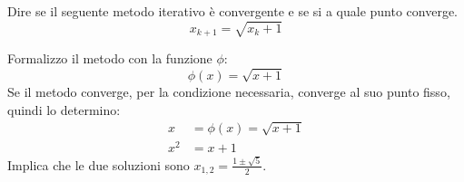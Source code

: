 \begin{exercise}
 Dire se il seguente metodo iterativo \`e convergente e se si a quale punto
 converge.
 \begin{displaymath}
 	x_{k+1} = \sqrt{x_{k} + 1}
 \end{displaymath}
\end{exercise}
Formalizzo il metodo con la funzione $\phi$:
\begin{displaymath}
 	\phi(x) = \sqrt{x + 1}
 \end{displaymath}
Se il metodo converge, per la condizione necessaria, converge al suo punto
fisso, quindi lo determino:
\begin{displaymath}
 \begin{split}
 	x &= \phi(x) = \sqrt{x + 1} \\
 	x^{2} &= x + 1 	
 \end{split}
\end{displaymath}
Implica che le due soluzioni sono $x_{1,2} = \frac{1 \pm \sqrt{5}}{2}$.

